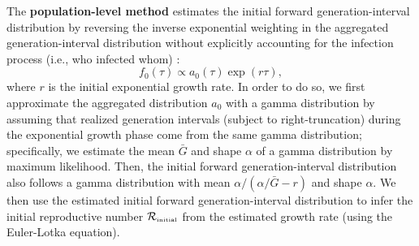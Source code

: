 \documentclass[12pt]{article}
\newcommand{\Rx}[1]{\ensuremath{{\mathcal R}_{#1}}\xspace}
\newcommand{\Rini}{\Rx{\textrm{\tiny initial}}}
\begin{document}
The \textbf{population-level method} estimates the initial forward generation-interval distribution by reversing the inverse exponential weighting in the aggregated generation-interval distribution without explicitly accounting for the infection process (i.e., who infected whom) \citep{tomba2010some, nishiura2010time, britton2019estimation}:
\begin{equation}
f_0(\tau) \propto a_0(\tau) \exp(r\tau),
\end{equation}
where $r$ is the initial exponential growth rate.
In order to do so, we first approximate the aggregated distribution $a_0$ with a gamma distribution by assuming that realized generation intervals (subject to right-truncation) during the exponential growth phase come from the same gamma distribution;
specifically, we estimate the mean $\bar G$ and shape $\alpha$ of a gamma distribution by maximum likelihood.
Then, the initial forward generation-interval distribution also follows a gamma distribution with mean $\alpha/(\alpha/\bar G - r)$ and shape $\alpha$.
We then use the estimated initial forward generation-interval distribution to infer the initial reproductive number $\Rini$ from the estimated growth rate (using the Euler-Lotka equation).
\end{document}
